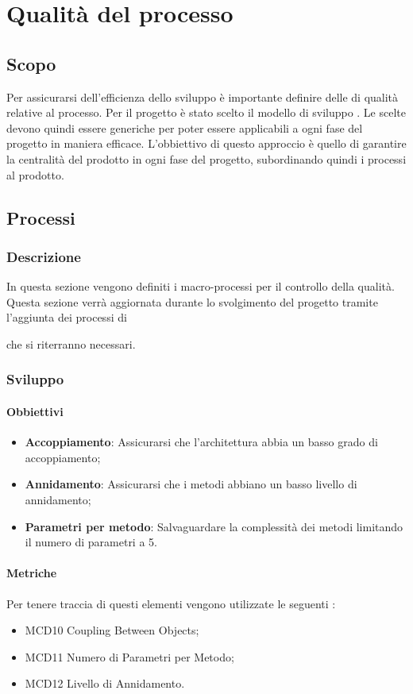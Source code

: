 \section{Qualità del processo}

\subsection{Scopo}
Per assicurarsi dell'efficienza dello sviluppo è importante definire delle  di qualità relative al processo.
Per il progetto è stato scelto il modello di sviluppo .
Le  scelte devono quindi essere generiche per poter essere applicabili a ogni fase del progetto in maniera efficace.
L'obbiettivo di questo approccio è quello di garantire la centralità del prodotto in ogni fase del progetto, subordinando quindi i processi al prodotto.

\subsection{Processi}
\subsubsection{Descrizione}
In questa sezione vengono definiti i macro-processi per il controllo della qualità.
Questa sezione verrà aggiornata durante lo svolgimento del progetto tramite l'aggiunta dei processi di  che si riterranno necessari.

\subsubsection{Sviluppo}
\paragraph{Obbiettivi}
\begin{itemize}
\item \textbf{Accoppiamento}: Assicurarsi che l'architettura abbia un basso grado di accoppiamento;
\item \textbf{Annidamento}: Assicurarsi che i metodi abbiano un basso livello di annidamento;
\item \textbf{Parametri per metodo}: Salvaguardare la complessità dei metodi limitando il numero di parametri a 5.
\end{itemize}

\paragraph{Metriche}
Per tenere traccia di questi elementi vengono utilizzate le seguenti :
\begin{itemize}
\item MCD10 Coupling Between Objects;
\item MCD11 Numero di Parametri per Metodo;
\item MCD12 Livello di Annidamento.

\end{itemize}

